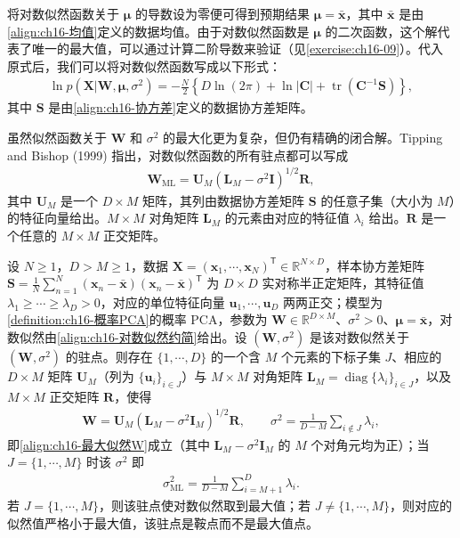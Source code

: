 \documentclass[../../main.tex]{subfiles}
\begin{document}
将对数似然函数关于 $\bm{\mu}$ 的导数设为零便可得到预期结果 $\bm{\mu}=\bar{\bm{x}}$，其中 $\bar{\bm{x}}$ 是由\eqref{align:ch16-均值}定义的数据均值。由于对数似然函数是 $\bm{\mu}$ 的二次函数，这个解代表了唯一的最大值，可以通过计算二阶导数来验证（见\cref{exercise:ch16-09}）。代入原式后，我们可以将对数似然函数写成以下形式：
\begin{align}
  \ln p(\bm{X}|\bm{W},\bm{\mu},\sigma^2)=-\frac{N}{2}\left\{D\ln(2\pi)+\ln|\bm{C}|+\operatorname{tr}\left(\bm{C}^{-1}\bm{S}\right)\right\},
  \label{align:ch16-对数似然约简}
\end{align}
其中 $\bm{S}$ 是由\eqref{align:ch16-协方差}定义的数据协方差矩阵。

虽然似然函数关于 $\bm{W}$ 和 $\sigma^2$ 的最大化更为复杂，但仍有精确的闭合解。Tipping and Bishop (1999) 指出，对数似然函数的所有驻点都可以写成
\begin{align}
  \bm{W}_{\text{ML}}=\bm{U}_M\left(\bm{L}_M-\sigma^2\bm{I}\right)^{1/2}\bm{R},
  \label{align:ch16-最大似然W}
\end{align}
其中 $\bm{U}_M$ 是一个 $D\times M$ 矩阵，其列由数据协方差矩阵 $\bm{S}$ 的任意子集（大小为 $M$）的特征向量给出。$M\times M$ 对角矩阵 $\bm{L}_M$ 的元素由对应的特征值 $\lambda_i$ 给出。$\bm{R}$ 是一个任意的 $M\times M$ 正交矩阵。

\begin{theorem}\label{theorem:ch16-最大似然解}
设 $N\geqslant1$，$D>M\geqslant1$，数据 $\bm{X}=(\bm{x}_1,\cdots,\bm{x}_N)^{\mathsf T}\in\mathbb{R}^{N\times D}$，样本协方差矩阵 $\bm{S}=\frac{1}{N}\sum_{n=1}^{N}(\bm{x}_n-\bar{\bm{x}})(\bm{x}_n-\bar{\bm{x}})^{\mathsf T}$ 为 $D\times D$ 实对称半正定矩阵，其特征值 $\lambda_1\geqslant\cdots\geqslant\lambda_D>0$，对应的单位特征向量 $\bm{u}_1,\cdots,\bm{u}_D$ 两两正交；模型为\cref{definition:ch16-概率PCA}的概率 PCA，参数为 $\bm{W}\in\mathbb{R}^{D\times M}$、$\sigma^2>0$、$\bm{\mu}=\bar{\bm{x}}$，对数似然由\eqref{align:ch16-对数似然约简}给出。设 $(\bm{W},\sigma^2)$ 是该对数似然关于 $(\bm{W},\sigma^2)$ 的驻点。则存在 $\{1,\cdots,D\}$ 的一个含 $M$ 个元素的下标子集 $J$、相应的 $D\times M$ 矩阵 $\bm{U}_M$（列为 $\{\bm{u}_i\}_{i\in J}$）与 $M\times M$ 对角矩阵 $\bm{L}_M=\operatorname{diag}\{\lambda_i\}_{i\in J}$，以及 $M\times M$ 正交矩阵 $\bm{R}$，使得
\begin{align*}
  \bm{W}=\bm{U}_M\left(\bm{L}_M-\sigma^2\bm{I}_M\right)^{1/2}\bm{R},\qquad
  \sigma^2=\frac{1}{D-M}\sum_{i\notin J}\lambda_i,
\end{align*}
即\eqref{align:ch16-最大似然W}成立（其中 $\bm{L}_M-\sigma^2\bm{I}_M$ 的 $M$ 个对角元均为正）；当 $J=\{1,\cdots,M\}$ 时该 $\sigma^2$ 即
\begin{align}
  \sigma^2_{\text{ML}}=\frac{1}{D-M}\sum_{i=M+1}^{D}\lambda_i.
  \label{align:ch16-最大似然sigma}
\end{align}
若 $J=\{1,\cdots,M\}$，则该驻点使对数似然取到最大值；若 $J\neq\{1,\cdots,M\}$，则对应的似然值严格小于最大值，该驻点是鞍点而不是最大值点。
\end{theorem}
\end{document}
